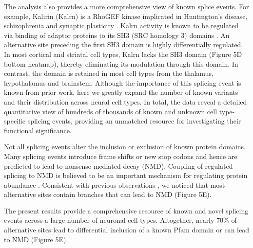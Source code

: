 The analysis also provides a more comprehensive view of known splice events. For example, Kalirin (Kalrn) is a RhoGEF kinase implicated in Huntington's disease, schizophrenia and synaptic plasticity \citep{Penzes_2008}. Kalrn activity is known to be regulated via binding of adaptor proteins to its SH3 (SRC homology 3) domains \citep{Schiller_2006}. An alternative site preceding the first SH3 domain is highly differentially regulated. In most cortical and striatal cell types, Kalrn lacks the SH3 domain (Figure 5D bottom heatmap), thereby eliminating its modulation through this domain. In contrast, the domain is retained in most cell types from the thalamus, hypothalamus and brainstem. Although the importance of this splicing event is known from prior work, here we greatly expand the number of known variants and their distribution across neural cell types. In total, the data reveal a detailed quantitative view of hundreds of thousands of known and unknown cell type-specific splicing events, providing an unmatched resource for investigating their functional significance.

Not all splicing events alter the inclusion or exclusion of known protein domains. Many splicing events introduce frame shifts or new stop codons and hence are predicted to lead to nonsense-mediated decay (NMD). Coupling of regulated splicing to NMD is believed to be an important mechanism for regulating protein abundance \cite{Lewis_2002}. Consistent with previous observations \citep{Yan_2015}, we noticed that most alternative sites contain branches that can lead to NMD (Figure 5E). 

The present results provide a comprehensive resource of known and novel splicing events across a large number of neuronal cell types. Altogether, nearly 70\% of alternative sites lead to differential inclusion of a known Pfam domain or can lead to NMD (Figure 5E). 
